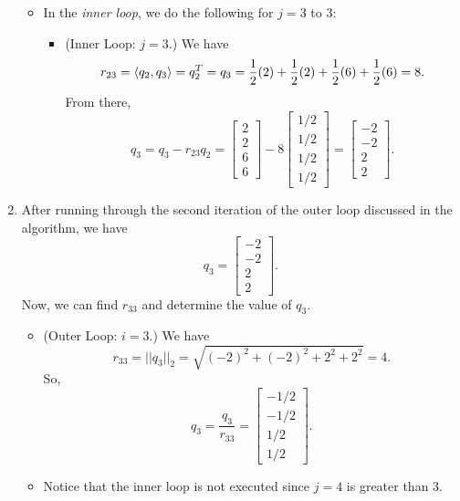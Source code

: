 \documentclass[letterpaper]{article}
\newcommand{\0}{\mathbf{0}}
\begin{document}
\begin{mdframed}
\begin{enumerate}
\begin{itemize}
            \item In the \emph{inner loop}, we do the following for $j = 3$ to $3$:
            \begin{itemize}
                \item (Inner Loop: $j = 3$.) We have 
                \[r_{23} = \langle q_2, q_3 \rangle = q_2^T = q_3 = \frac{1}{2}(2) + \frac{1}{2}(2) + \frac{1}{2}(6) + \frac{1}{2}(6) = 8.\]
                From there, 
                \[q_3 = q_3 - r_{23}q_2 = \begin{bmatrix}
                    2\\2\\6\\6
                \end{bmatrix} - 8\begin{bmatrix}
                    1/2 \\ 1/2 \\ 1/2 \\ 1/2
                \end{bmatrix} = \begin{bmatrix}
                    -2 \\ -2 \\ 2 \\ 2
                \end{bmatrix}.\]
            \end{itemize}
        \end{itemize}

        \item After running through the second iteration of the outer loop discussed in the algorithm, we have 
        \[q_3 = \begin{bmatrix}
            -2 \\ -2 \\ 2 \\ 2
        \end{bmatrix}.\]
        Now, we can find $r_{33}$ and determine the value of $q_3$. 
        \begin{itemize}
            \item (Outer Loop: $i = 3$.) We have 
            \[r_{33} = ||q_3||_2 = \sqrt{(-2)^2 + (-2)^2 + 2^2 + 2^2} = 4.\]
            So, 
            \[q_3 = \frac{q_3}{r_{33}} = \begin{bmatrix}
                -1/2 \\ -1/2 \\ 1/2 \\ 1/2
            \end{bmatrix}.\]

            \item Notice that the inner loop is not executed since $j = 4$ is greater than $3$.
        \end{itemize}
    \end{enumerate}
\end{mdframed}
\end{document}
